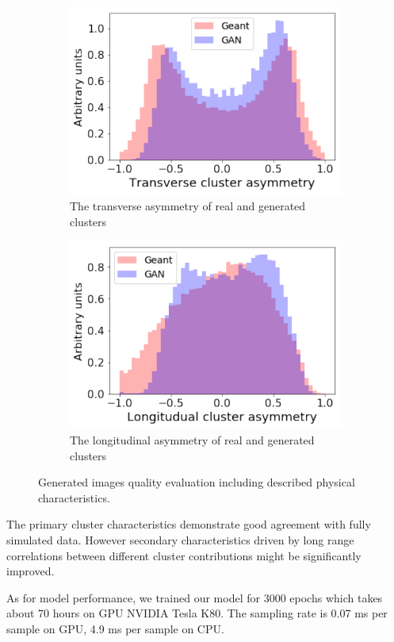 \begin{figure}
\begin{subfigure}[b]{0.35\textwidth}
    \includegraphics[width=1\textwidth]{figures/transverseAsymmetry.pdf}
    \caption{The transverse asymmetry of real and generated clusters}
  \end{subfigure}\hspace{0.2\textwidth}
  \begin{subfigure}[b]{0.35\textwidth}
    \centering
    \includegraphics[width=1\textwidth]{figures/longAsymmetry.pdf}
    \caption{The longitudinal asymmetry of real and generated clusters}
  \end{subfigure}
  \caption{Generated images quality evaluation including described physical characteristics.}\label{fig:quality}  
\end{figure}

The primary cluster characteristics  demonstrate good agreement with
fully simulated data. However secondary characteristics driven by
long range correlations between different cluster contributions might
be significantly improved.  




As for model performance, we trained our model for 3000 epochs which takes about 70 hours on GPU NVIDIA Tesla K80. The sampling rate is 0.07 ms per sample on GPU, 4.9 ms per sample on CPU.
